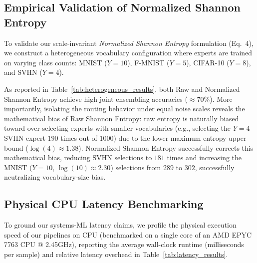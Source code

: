 \subsection{Empirical Validation of Normalized Shannon Entropy}
To validate our scale-invariant \emph{Normalized Shannon Entropy} formulation (Eq.~4), we construct a heterogeneous vocabulary configuration where experts are trained on varying class counts: MNIST ($Y=10$), F-MNIST ($Y=5$), CIFAR-10 ($Y=8$), and SVHN ($Y=4$). 

As reported in Table~\ref{tab:heterogeneous_results}, both Raw and Normalized Shannon Entropy achieve high joint ensembling accuracies ($\approx 70\%$). More importantly, isolating the routing behavior under equal noise scales reveals the mathematical bias of Raw Shannon Entropy: raw entropy is naturally biased toward over-selecting experts with smaller vocabularies (e.g., selecting the $Y=4$ SVHN expert $190$ times out of $1000$) due to the lower maximum entropy upper bound ($\log(4) \approx 1.38$). Normalized Shannon Entropy successfully corrects this mathematical bias, reducing SVHN selections to $181$ times and increasing the MNIST ($Y=10$, $\log(10) \approx 2.30$) selections from $289$ to $302$, successfully neutralizing vocabulary-size bias.

\begin{table}[t]
\caption{Task-wise and Joint Mean Accuracy (\%) under heterogeneous class vocabularies: MNIST ($Y=10$), F-MNIST ($Y=5$), CIFAR-10 ($Y=8$), and SVHN ($Y=4$).}
\label{tab:heterogeneous_results}
\vskip 0.15in
\begin{center}
\begin{small}
\begin{sc}
\end{sc}
\end{small}
\end{center}
\vskip -0.1in
\end{table}

\subsection{Physical CPU Latency Benchmarking}
To ground our systems-ML latency claims, we profile the physical execution speed of our pipelines on CPU (benchmarked on a single core of an AMD EPYC 7763 CPU @ 2.45GHz), reporting the average wall-clock runtime (milliseconds per sample) and relative latency overhead in Table~\ref{tab:latency_results}.


